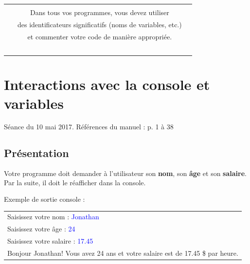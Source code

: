 \documentclass[12pt]{article}
\begin{document}

\begin{center}
\begin{tabular}{c c c}
\hline \\
\quad & Dans tous vos programmes, vous devez utiliser & \quad \\
& des identificateurs significatifs (noms de variables, etc.)\\
& et commenter votre code de manière appropriée.\\
\ \\
\hline
\end{tabular}
\end{center}




%
%

\section{Interactions avec la console et variables}
\vspace*{-\baselineskip}
Séance du 10 mai 2017. Références du manuel : p. 1 à 38

%
%
%

\subsection{Présentation}

Votre programme doit demander à l'utilisateur son \textbf{nom}, son \textbf{âge} et son \textbf{salaire}. Par la suite, il doit le réafficher dans la console.

Exemple de sortie console :

{\footnotesize {}\selectfont
\begin{tabular}{|p{}|}
\hline 
Saisissez votre nom : \textcolor{blue}{Jonathan}\\
Saisissez votre âge : \textcolor{blue}{24}\\
Saisissez votre salaire : \textcolor{blue}{17.45}\\[\baselineskip]

Bonjour Jonathan! Vous avez 24 ans et votre salaire est de 17.45 \$ par heure.\\
\hline
\end{tabular}
}
\end{document}
